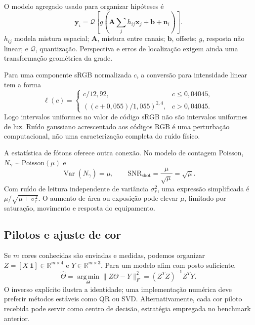 \documentclass[11pt,a4paper]{article}
\newcommand{\Var}{\operatorname{Var}}
\newcommand{\argmin}{\operatorname*{arg\,min}}
\begin{document}
O modelo agregado usado para organizar hipóteses é
\begin{equation}\label{eq:channel}
\mathbf y_i=\mathcal Q\!\left[g\!\left(\mathbf A\sum_jh_{ij}\mathbf x_j+\mathbf b+\mathbf n_i\right)\right].
\end{equation}
$h_{ij}$ modela mistura espacial; $\mathbf A$, mistura entre canais; $\mathbf b$, offsets; $g$, resposta não linear; e $\mathcal Q$, quantização. Perspectiva e erros de localização exigem ainda uma transformação geométrica da grade.

Para uma componente sRGB normalizada $c$, a conversão para intensidade linear tem a forma~\cite{2026w3cColor}
\begin{equation}
\ell(c)=\begin{cases}c/12,92,&c\le0,04045,\\
((c+0,055)/1,055)^{2,4},&c>0,04045.
\end{cases}
\end{equation}
Logo intervalos uniformes no valor de código sRGB não são intervalos uniformes de luz. Ruído gaussiano acrescentado aos códigos RGB é uma perturbação computacional, não uma caracterização completa do ruído físico.

A estatística de fótons oferece outra conexão. No modelo de contagem Poisson, $N_\gamma\sim\mathrm{Poisson}(\mu)$ e~\cite{2021emvaLinear}
\begin{equation}
\Var(N_\gamma)=\mu,\qquad\mathrm{SNR}_{\mathrm{shot}}=\frac{\mu}{\sqrt\mu}=\sqrt\mu.
\end{equation}
Com ruído de leitura independente de variância $\sigma_r^2$, uma expressão simplificada é $\mu/\sqrt{\mu+\sigma_r^2}$. O aumento de área ou exposição pode elevar $\mu$, limitado por saturação, movimento e resposta do equipamento.

\subsection{Pilotos e ajuste de cor}
Se $m$ cores conhecidas são enviadas e medidas, podemos organizar $Z=[X\ \mathbf1]\in\mathbb R^{m\times4}$ e $Y\in\mathbb R^{m\times3}$. Para um modelo afim com posto suficiente,
\begin{equation}
\widehat\Theta=\argmin_\Theta\|Z\Theta-Y\|_F^2
=(Z^TZ)^{-1}Z^TY.
\end{equation}
O inverso explícito ilustra a identidade; uma implementação numérica deve preferir métodos estáveis como QR ou SVD. Alternativamente, cada cor piloto recebida pode servir como centro de decisão, estratégia empregada no benchmark anterior.
\end{document}
